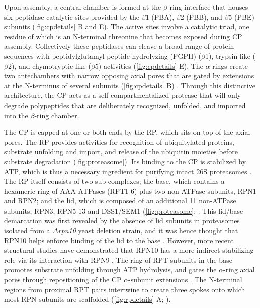 Upon assembly, a central chamber is formed at the $\beta$-ring interface that houses six peptidase catalytic sites provided by the $\beta$1 (PBA), $\beta$2 (PBB), and $\beta$5 (PBE) subunits \citep{arendt97, heinemeyer97} (\ref{fig:cpdetails} B and E).  The active sites involve a catalytic triad, one residue of which is an N-terminal threonine that becomes exposed during CP assembly.  Collectively these peptidases can cleave a broad range of protein sequences with peptidylglutamyl-peptide hydrolyzing (PGPH) ($\beta$1), trypsin-like ($\beta$2), and chymotryptic-like ($\beta$5) activities \citep{arendt97, groll99} (\ref{fig:cpdetails} E).  The $\alpha$-rings create two antechambers with narrow opposing axial pores that are gated by extensions at the N-terminus of several subunits (\ref{fig:cpdetails} B) \citep{groll00, ruschak10}.  Through this distinctive architecture, the CP acts as a self-compartmentalized protease that will only degrade polypeptides that are deliberately recognized, unfolded, and imported into the $\beta$-ring chamber.



	
	The CP is capped at one or both ends by the RP, which sits on top of the axial pores.  The RP provides activities for recognition of ubiquitylated proteins, substrate unfolding and import, and release of the ubiquitin moieties before substrate degradation (\ref{fig:proteasome}).  Its binding to the CP is stabilized by ATP, which is thus a necessary ingredient for purifying intact 26S proteasomes \citep{smith05}. The RP itself consists of two sub-complexes; the base, which contains a hexameric ring of AAA-ATPases (RPT1-6) plus two non-ATPase subunits, RPN1 and RPN2; and the lid, which is composed of an additional 11 non-ATPase subunits, RPN3, RPN5-13 and DSS1/SEM1 (\ref{fig:proteasome}; \citep{bhattacharyya14, book10, finley09, glickman98-c8Wsa, russell13}.  This lid/base demarcation was first revealed by the absence of lid subunits in proteasomes isolated from a \textit{Δrpn10} yeast deletion strain, and it was hence thought that RPN10 helps enforce binding of the lid to the base \citep{glickman98}.  However, more recent structural studies have demonstrated that RPN10 has a more indirect stabilizing role via its interaction with RPN9 \citep{lander12}.  The ring of RPT subunits in the base promotes substrate unfolding through ATP hydrolysis, and gates the $\alpha$-ring axial pores through repositioning of the CP $\alpha$-subunit extensions \citep{köhler01, rabl08, smith05}.  The N-terminal regions from proximal RPT pairs intertwine to create three spokes onto which most RPN subunits are scaffolded (\ref{fig:rpdetails} A; \citep{beck12}).

